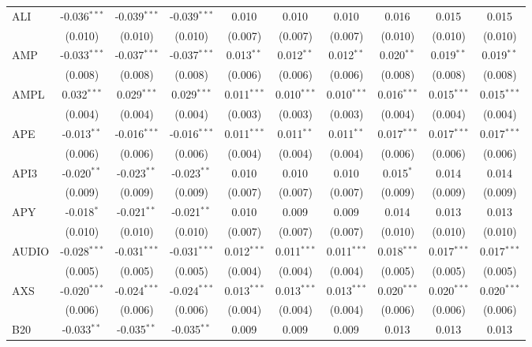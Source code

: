 \begin{table}[!htbp]
\begin{tabular}{@{\extracolsep{5pt}}lccccccccc}
 ALI & -0.036$^{***}$ & -0.039$^{***}$ & -0.039$^{***}$ & 0.010$^{}$ & 0.010$^{}$ & 0.010$^{}$ & 0.016$^{}$ & 0.015$^{}$ & 0.015$^{}$ \\
  & (0.010) & (0.010) & (0.010) & (0.007) & (0.007) & (0.007) & (0.010) & (0.010) & (0.010) \\
 AMP & -0.033$^{***}$ & -0.037$^{***}$ & -0.037$^{***}$ & 0.013$^{**}$ & 0.012$^{**}$ & 0.012$^{**}$ & 0.020$^{**}$ & 0.019$^{**}$ & 0.019$^{**}$ \\
  & (0.008) & (0.008) & (0.008) & (0.006) & (0.006) & (0.006) & (0.008) & (0.008) & (0.008) \\
 AMPL & 0.032$^{***}$ & 0.029$^{***}$ & 0.029$^{***}$ & 0.011$^{***}$ & 0.010$^{***}$ & 0.010$^{***}$ & 0.016$^{***}$ & 0.015$^{***}$ & 0.015$^{***}$ \\
  & (0.004) & (0.004) & (0.004) & (0.003) & (0.003) & (0.003) & (0.004) & (0.004) & (0.004) \\
 APE & -0.013$^{**}$ & -0.016$^{***}$ & -0.016$^{***}$ & 0.011$^{***}$ & 0.011$^{**}$ & 0.011$^{**}$ & 0.017$^{***}$ & 0.017$^{***}$ & 0.017$^{***}$ \\
  & (0.006) & (0.006) & (0.006) & (0.004) & (0.004) & (0.004) & (0.006) & (0.006) & (0.006) \\
 API3 & -0.020$^{**}$ & -0.023$^{**}$ & -0.023$^{**}$ & 0.010$^{}$ & 0.010$^{}$ & 0.010$^{}$ & 0.015$^{*}$ & 0.014$^{}$ & 0.014$^{}$ \\
  & (0.009) & (0.009) & (0.009) & (0.007) & (0.007) & (0.007) & (0.009) & (0.009) & (0.009) \\
 APY & -0.018$^{*}$ & -0.021$^{**}$ & -0.021$^{**}$ & 0.010$^{}$ & 0.009$^{}$ & 0.009$^{}$ & 0.014$^{}$ & 0.013$^{}$ & 0.013$^{}$ \\
  & (0.010) & (0.010) & (0.010) & (0.007) & (0.007) & (0.007) & (0.010) & (0.010) & (0.010) \\
 AUDIO & -0.028$^{***}$ & -0.031$^{***}$ & -0.031$^{***}$ & 0.012$^{***}$ & 0.011$^{***}$ & 0.011$^{***}$ & 0.018$^{***}$ & 0.017$^{***}$ & 0.017$^{***}$ \\
  & (0.005) & (0.005) & (0.005) & (0.004) & (0.004) & (0.004) & (0.005) & (0.005) & (0.005) \\
 AXS & -0.020$^{***}$ & -0.024$^{***}$ & -0.024$^{***}$ & 0.013$^{***}$ & 0.013$^{***}$ & 0.013$^{***}$ & 0.020$^{***}$ & 0.020$^{***}$ & 0.020$^{***}$ \\
  & (0.006) & (0.006) & (0.006) & (0.004) & (0.004) & (0.004) & (0.006) & (0.006) & (0.006) \\
 B20 & -0.033$^{**}$ & -0.035$^{**}$ & -0.035$^{**}$ & 0.009$^{}$ & 0.009$^{}$ & 0.009$^{}$ & 0.013$^{}$ & 0.013$^{}$ & 0.013$^{}$ \\

\end{tabular}
\end{table}
